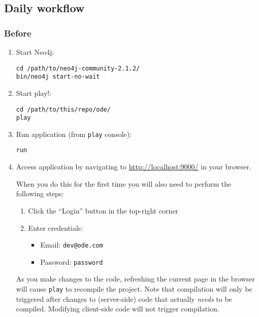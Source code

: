 \documentclass[11pt]{article}
\begin{document}
\subsection{Daily workflow}
\label{sec-2-3}
\subsubsection{Before}
\label{sec-2-3-1}
\begin{enumerate}
\item Start Neo4j:

\begin{verbatim}
cd /path/to/neo4j-community-2.1.2/
bin/neo4j start-no-wait
\end{verbatim}

\item Start play!:

\begin{verbatim}
cd /path/to/this/repo/ode/
play
\end{verbatim}

\item Run application (from \texttt{play} console):

\begin{verbatim}
run
\end{verbatim}

\item Access application by navigating to \url{http://localhost:9000/} in
your browser.

When you do this for the first time you will also need to perform
the following steps:

\begin{enumerate}
\item Click the ``Login'' button in the top-right corner

\item Enter credentials:
\begin{itemize}
\item Email: \texttt{dev@ode.com}
\item Password: \texttt{password}
\end{itemize}
\end{enumerate}
As you make changes to the code, refreshing the current page in
the browser will cause \texttt{play} to recompile the project.
Note that compilation will only be triggered after changes to
(server-side) code that actually \emph{needs} to be compiled.
Modifying client-side code will not trigger compilation.
\end{enumerate}
\end{document}

